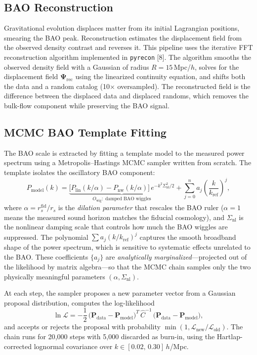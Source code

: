\documentclass[10pt]{article}
\begin{document}
\subsection{BAO Reconstruction}

Gravitational evolution displaces matter from its initial Lagrangian positions, smearing the BAO peak.  Reconstruction estimates the displacement field from the observed density contrast and reverses it.  This pipeline uses the iterative FFT reconstruction algorithm implemented in \texttt{pyrecon} [8].  The algorithm smooths the observed density field with a Gaussian of radius $R = 15$\,Mpc/$h$, solves for the displacement field $\boldsymbol{\Psi}_{\mathrm{rec}}$ using the linearized continuity equation, and shifts both the data and a random catalog (10$\times$ oversampled).  The reconstructed field is the difference between the displaced data and displaced randoms, which removes the bulk-flow component while preserving the BAO signal.

\subsection{MCMC BAO Template Fitting}

The BAO scale is extracted by fitting a template model to the measured power spectrum using a Metropolis--Hastings MCMC sampler written from scratch.  The template isolates the oscillatory BAO component:
\begin{equation}
  P_{\mathrm{model}}(k) = \underbrace{\bigl[P_{\mathrm{lin}}(k/\alpha) - P_{\mathrm{nw}}(k/\alpha)\bigr]\,e^{-k^2 \Sigma_{\mathrm{nl}}^2/2}}_{O_{\mathrm{wig}}:\;\text{damped BAO wiggles}} + \sum_{j=0}^{n} a_j \left(\frac{k}{k_{\mathrm{ref}}}\right)^j,
\end{equation}
where $\alpha = r_s^{\mathrm{fid}}/r_s$ is the \emph{dilation parameter} that rescales the BAO ruler ($\alpha = 1$ means the measured sound horizon matches the fiducial cosmology), and $\Sigma_{\mathrm{nl}}$ is the nonlinear damping scale that controls how much the BAO wiggles are suppressed.  The polynomial $\sum a_j (k/k_{\mathrm{ref}})^j$ captures the smooth broadband shape of the power spectrum, which is sensitive to systematic effects unrelated to the BAO.  These coefficients $\{a_j\}$ are \emph{analytically marginalized}---projected out of the likelihood by matrix algebra---so that the MCMC chain samples only the two physically meaningful parameters $(\alpha, \Sigma_{\mathrm{nl}})$.

At each step, the sampler proposes a new parameter vector from a Gaussian proposal distribution, computes the log-likelihood
\begin{equation}
  \ln \mathcal{L} = -\frac{1}{2}\,\bigl(\mathbf{P}_{\mathrm{data}} - \mathbf{P}_{\mathrm{model}}\bigr)^T\,\hat{C}^{-1}\,\bigl(\mathbf{P}_{\mathrm{data}} - \mathbf{P}_{\mathrm{model}}\bigr),
\end{equation}
and accepts or rejects the proposal with probability $\min(1, \mathcal{L}_{\mathrm{new}}/\mathcal{L}_{\mathrm{old}})$.  The chain runs for 20{,}000 steps with 5{,}000 discarded as burn-in, using the Hartlap-corrected lognormal covariance over $k \in [0.02,\,0.30]$\,$h$/Mpc.
\end{document}
